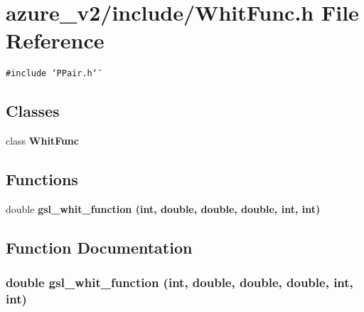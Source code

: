 \section{azure\_\-v2/include/Whit\-Func.h File Reference}
\label{WhitFunc_8h}
{\tt \#include \char`\"{}PPair.h\char`\"{}}\par
\subsection*{Classes}
\begin{CompactItemize}
\item 
class \bf{Whit\-Func}
\end{CompactItemize}
\subsection*{Functions}
\begin{CompactItemize}
\item 
double \bf{gsl\_\-whit\_\-function} (int, double, double, double, int, int)
\end{CompactItemize}


\subsection{Function Documentation}
\subsubsection{\setlength{\rightskip}{0pt plus 5cm}double gsl\_\-whit\_\-function (int, double, double, double, int, int)}\label{WhitFunc_8h_7b684c5ac53a6714b4091efa2bad98f9}


